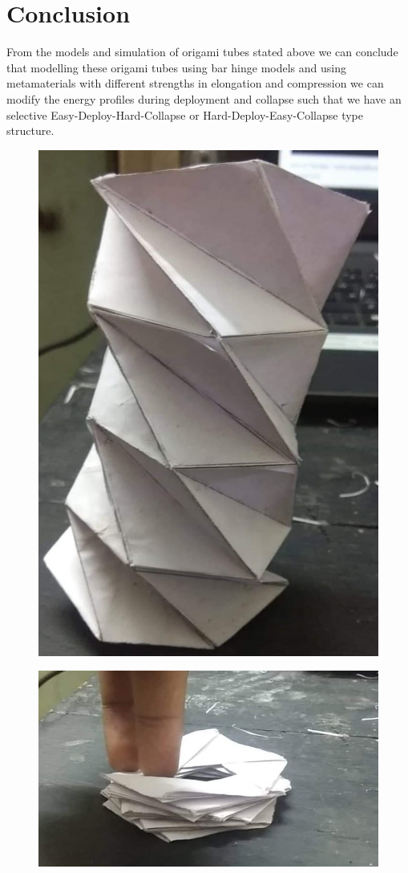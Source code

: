 \section{Conclusion}
From the models and simulation of origami tubes stated above we can conclude that modelling these origami tubes using bar hinge models and using metamaterials with different strengths in elongation and compression we can modify the energy profiles during deployment and collapse such that we have an selective Easy-Deploy-Hard-Collapse or Hard-Deploy-Easy-Collapse type structure.

\begin{figure}[htbp]
\centering
\begin{minipage}{.4\textwidth}
  \centering
  \includegraphics[width=.4\linewidth]{Figures/EDEC_Model.jpeg}
  \label{fig:EDEC_model}
\end{minipage}%
\hspace{2cm}
\begin{minipage}{.4\textwidth}
  \centering
  \vspace{2cm}
  \includegraphics[width=.4\linewidth]{Figures/EDEC_Model_collapsed.jpeg}
  \label{fig:EDEC_Model_Collapsed}
\end{minipage}
\end{figure}
\vspace{-3cm}

